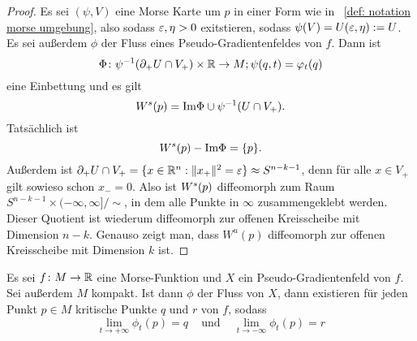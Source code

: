 \begin{proof}
    Es sei $(\psi, V)$ eine Morse Karte um $p$ in einer Form wie in ~\ref{def: notation morse umgebung},
    also sodass $\varepsilon, \eta > 0$ exitstieren, sodass $\psi(V) = U(\varepsilon, \eta) := U$. Es sei außerdem
    $\phi$ der Fluss eines Pseudo-Gradientenfeldes von $f$. Dann ist 
    \[ \Phi \colon \psi^{-1}({ \partial }_+ U \cap V_+) \times { \mathbb R } \to M ; \psi(q, t) = \varphi_t(q) \]
    eine Einbettung und es gilt 
    \[ { W^s } (p) = { \operatorname{Im} } \Phi \cup \psi^{-1}(U \cap V_+) . \]
    Tatsächlich ist 
    \[ { W^s } (p) - { \operatorname{Im} } \Phi = \{ p \} . \]
    Außerdem ist ${ \partial }_+ U \cap V_+ = \{ x \in { \mathbb R }^n: \| x_+ \|^2 = \varepsilon \} \approx S^{n - k - 1}$, 
    denn für alle $x \in V_+$ gilt sowieso schon $x_- = 0$. Also ist $ { W^s }(p)$ diffeomorph zum Raum 
    $S^{n - k - 1} \times (-\infty, \infty]/\sim$, in dem alle Punkte in $\infty$ zusammengeklebt 
    werden. Dieser Quotient ist wiederum diffeomorph zur offenen Kreisscheibe mit Dimension $n - k$.
    Genauso zeigt man, dass $W^u (p)$ diffeomorph zur offenen Kreisscheibe mit Dimension $k$ ist.
\end{proof}

\begin{prop}
    \label{prop: trajektorien enden in kritischen punkten}
    Es sei $f \colon M \to { \mathbb R }$ eine Morse-Funktion und $X$ ein Pseudo-Gradientenfeld von $f$. 
    Sei außerdem $M$ kompakt. Ist dann $\phi$ der Fluss von $X$, dann existieren für jeden Punkt 
    $p \in M$ kritische Punkte $q$ und $r$ von $f$, sodass
    \[ \lim_{t \to + \infty} \phi_t(p) = q \;\;\; 
    \text{ und } \;\;\; \lim_{t \to -\infty} \phi_t(p) = r \]
\end{prop}

